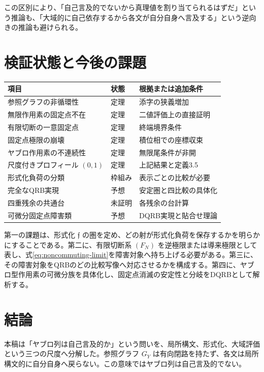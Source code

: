 \documentclass[a4paper,11pt]{ltjsarticle}
\theoremstyle{definition}
\theoremstyle{plain}
\begin{document}
この区別により、「自己言及的でないから真理値を割り当てられるはずだ」という推論も、「大域的に自己依存するから各文が自分自身へ言及する」という逆向きの推論も避けられる。

\section{検証状態と今後の課題}

\begin{center}
\begin{tabular}{p{} p{} p{}}
\toprule
項目 & 状態 & 根拠または追加条件 \\
\midrule
参照グラフの非循環性 & 定理 & 添字の狭義増加 \\
無限作用素の固定点不在 & 定理 & 二値評価上の直接証明 \\
有限切断の一意固定点 & 定理 & 終端境界条件 \\
固定点極限の崩壊 & 定理 & 積位相での座標収束 \\
ヤブロ作用素の不連続性 & 定理 & 無限尾条件が非開 \\
尺度付きプロフィール $(0,1)$ & 定理 & 上記結果と定義3.5 \\
形式化負荷の分類 & 枠組み & 表示ごとの比較が必要 \\
完全なQRB実現 & 予想 & 安定圏と四比較の具体化 \\
四重残余の共通台 & 未証明 & 各残余の台計算 \\
可微分固定点障害類 & 予想 & DQRB実現と貼合せ理論 \\
\bottomrule
\end{tabular}
\end{center}

第一の課題は、形式化 $\mathfrak f$ の圏を定め、どの射が形式化負荷を保存するかを明らかにすることである。第二に、有限切断系 $(F_N)$ を逆極限または導来極限として表し、式\eqref{eq:noncommuting-limit}を障害対象へ持ち上げる必要がある。第三に、その障害対象をQRBのどの比較写像へ対応させるかを構成する。第四に、ヤブロ型作用素の可微分族を具体化し、固定点消滅の安定性と分岐をDQRBとして解析する。

\section{結論}

本稿は「ヤブロ列は自己言及的か」という問いを、局所構文、形式化、大域評価という三つの尺度へ分解した。参照グラフ $G_Y$ は有向閉路を持たず、各文は局所構文的に自分自身へ戻らない。この意味ではヤブロ列は自己言及的でない。
\end{document}
